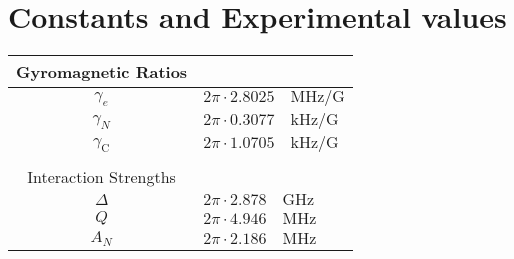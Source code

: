 
\chapter{Constants and Experimental values}


\begin{table}[htbp]
    \begin{tabular}{cl}

    Gyromagnetic Ratios  \\ \hline
    $\gamma_e $ & $2\pi \cdot 2.8025\quad \mathrm{MHz/G} $ \\
    $\gamma_{N}$ & $2\pi \cdot 0.3077\quad \mathrm{kHz/G}$   \\
    $\gamma_\mathrm{C}$ & $2\pi \cdot 1.0705\quad \mathrm{kHz/G}$   \\ \hline
    \\
    Interaction Strengths  \\ \hline
    $\Delta $ & $2\pi \cdot 2.878\quad \mathrm{GHz} $\\
    $Q $ & $2\pi \cdot 4.946\quad \mathrm{MHz} $\\
    $A_N $ & $2\pi \cdot 2.186\quad \mathrm{MHz} $\\ \hline
    \end{tabular}
    \label{tbl:constants and experimental values}
\end{table}
